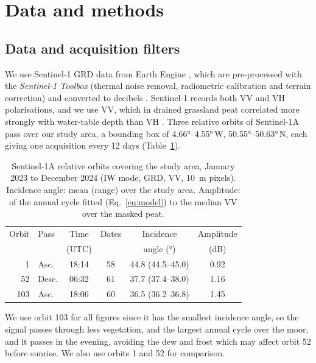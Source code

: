 \documentclass[10pt,a4paper,twocolumn]{article}
\begin{document}
\section{Data and methods}

\subsection{Data and acquisition filters}

We use Sentinel-1 GRD data from Earth Engine \cite{gorelick2017}, which are pre-processed with the \emph{Sentinel-1 Toolbox} (thermal noise removal, radiometric calibration and terrain correction) and converted to decibels \cite{eeS1grd}.
Sentinel-1 records both VV and VH polarisations, and we use VV, which in drained grassland peat correlated more strongly with water-table depth than VH \cite{asmuss2019potential}.
Three relative orbits of Sentinel-1A pass over our study area, a bounding box of \ang{4.66}--\ang{4.55}\,W, \ang{50.55}--\ang{50.63}\,N, each giving one acquisition every 12 days (Table~\ref{tab:orbits}).

\begin{table}[h!]
  \centering
  \small
  \caption{Sentinel-1A relative orbits covering the study area, January 2023 to
  December 2024 (IW mode, GRD, VV, \SI{10}{\metre} pixels). Incidence angle:
  mean (range) over the study area. Amplitude: of the annual cycle fitted
  (Eq.~\ref{eq:model}) to the median VV over the masked peat.}
  \label{tab:orbits}
  \setlength{\tabcolsep}{4pt}
  \begin{tabular}{@{}rlcccc@{}}
    \toprule
    Orbit & Pass  & Time  & Dates & Incidence        & Amplitude \\
          &       & (UTC) &       & angle (\si{\degree}) & (dB)      \\
    \midrule
    1     & Asc.  & 18:14 & 58    & 44.8 (44.5--45.0) & 0.92 \\
    52    & Desc. & 06:32 & 61    & 37.7 (37.4--38.0) & 1.16 \\
    103   & Asc.  & 18:06 & 60    & 36.5 (36.2--36.8) & 1.45 \\
    \bottomrule
  \end{tabular}
\end{table}

We use orbit 103 for all figures since it has the smallest incidence angle, so the signal passes through less vegetation, and the largest annual cycle over the moor, and it passes in the evening, avoiding the dew and frost which may affect orbit 52 before sunrise.
We also use orbits 1 and 52 for comparison. 
\end{document}
